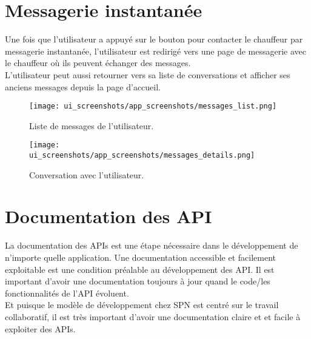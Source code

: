 \section{Messagerie instantanée}
Une fois que l'utilisateur a appuyé sur le bouton pour contacter le chauffeur par messagerie instantanée, l'utilisateur est redirigé vers une page de messagerie avec le chauffeur où ils peuvent échanger des messages.\\
\noindent L'utilisateur peut aussi retourner vers sa liste de conversations et afficher ses anciens messages depuis la page d'accueil.
\clearpage
\begin{multicols}{2}
    \begin{figure}[H]
        \centering
        \texttt{[image: ui\_screenshots/app\_screenshots/messages\_list.png]}
        \vspace{1cm}
        \captionsetup{justification=centering}
        \caption{Liste de messages de l'utilisateur.}
        \label{fig:message_list}
    \end{figure}
    \begin{figure}[H]
        \centering
        \texttt{[image: ui\_screenshots/app\_screenshots/messages\_details.png]}
        \vspace{1cm}
        \captionsetup{justification=centering}
        \caption{Conversation avec l'utilisateur.}
        \label{fig:conversation}
    \end{figure}
\end{multicols}
\section{Documentation des API}
La documentation des APIs est une étape nécessaire dans le développement de n'importe quelle application. Une documentation accessible et facilement exploitable est une condition préalable au développement des API. Il est important d'avoir une documentation toujours à jour quand le code/les fonctionnalités de l'API évoluent.\\
\noindent Et puisque le modèle de développement chez SPN est centré sur le travail collaboratif, il est très important d'avoir une documentation claire et et facile à exploiter des APIs.

